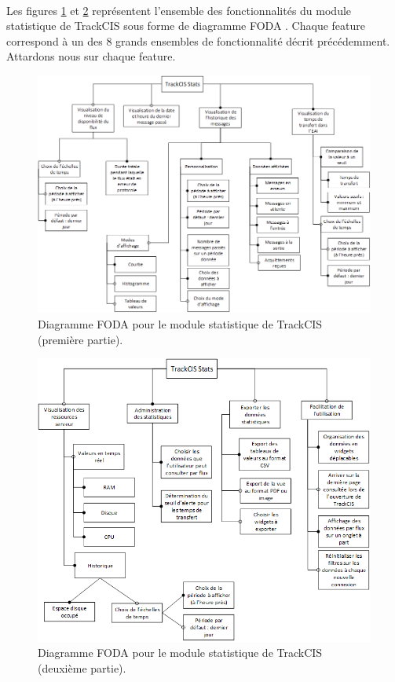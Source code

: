 			\paragraph{}
			Les figures \ref{foda_1} et \ref{foda_2} représentent l'ensemble des
			fonctionnalités du module statistique de TrackCIS sous forme de diagramme
			FODA . Chaque feature correspond à un des 8 grands
			ensembles de fonctionnalité décrit précédemment. Attardons nous sur chaque
			feature. 
			\begin{figure}%
				\centering
				\includegraphics[width=17cm]{../img/part2/foda_1.png}
				\caption{\label{foda_1} Diagramme FODA pour le module statistique de
				TrackCIS (première partie).}
			\end{figure}
			\begin{figure}%
				\centering
				\includegraphics[width=17cm]{../img/part2/foda_2.png}
				\caption{\label{foda_2} Diagramme FODA pour le module statistique de
				TrackCIS (deuxième partie).}
			\end{figure}
			
